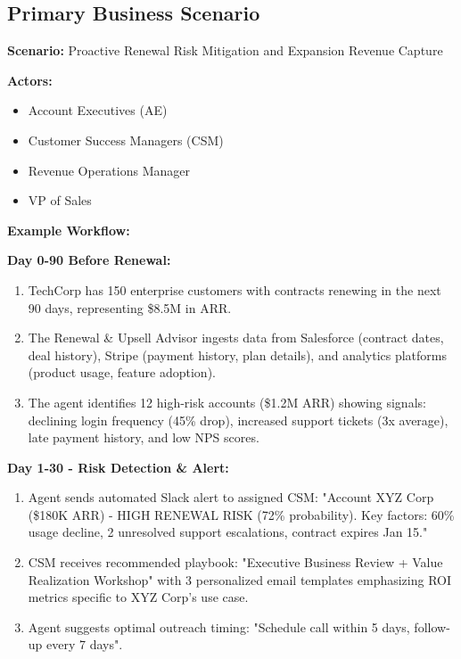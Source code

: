 \documentclass[12pt,a4paper]{article}
\begin{document}
\subsection{Primary Business Scenario}
\textbf{Scenario:} Proactive Renewal Risk Mitigation and Expansion Revenue Capture

\textbf{Actors:}
\begin{itemize}
    \item Account Executives (AE)
    \item Customer Success Managers (CSM)
    \item Revenue Operations Manager
    \item VP of Sales
\end{itemize}

\textbf{Example Workflow:}

\textbf{Day 0-90 Before Renewal:}
\begin{enumerate}
    \item TechCorp has 150 enterprise customers with contracts renewing in the next 90 days, representing \$8.5M in ARR.
    \item The Renewal \& Upsell Advisor ingests data from Salesforce (contract dates, deal history), Stripe (payment history, plan details), and analytics platforms (product usage, feature adoption).
    \item The agent identifies 12 high-risk accounts (\$1.2M ARR) showing signals: declining login frequency (45\% drop), increased support tickets (3x average), late payment history, and low NPS scores.
\end{enumerate}

\textbf{Day 1-30 - Risk Detection \& Alert:}
\begin{enumerate}
    \item Agent sends automated Slack alert to assigned CSM: "Account XYZ Corp (\$180K ARR) - HIGH RENEWAL RISK (72\% probability). Key factors: 60\% usage decline, 2 unresolved support escalations, contract expires Jan 15."
    \item CSM receives recommended playbook: "Executive Business Review + Value Realization Workshop" with 3 personalized email templates emphasizing ROI metrics specific to XYZ Corp’s use case.
    \item Agent suggests optimal outreach timing: "Schedule call within 5 days, follow-up every 7 days".
\end{enumerate}
\end{document}
